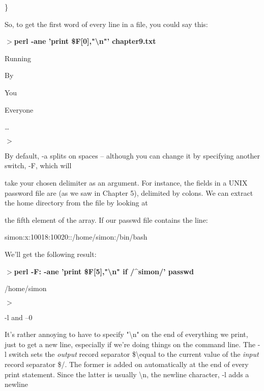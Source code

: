 \documentclass[a4paper,11pt]{book}
\begin{document}
\noindent \}

\noindent 

\noindent So, to get the first word of every line in a file, you could say this:

\noindent 

\noindent $>$\textbf{perl -ane 'print \$F[0],"\textbackslash n"' chapter9.txt}

\noindent Running

\noindent 

\noindent By

\noindent 

\noindent You

\noindent 

\noindent Everyone

\noindent \dots 

\noindent $>$

\noindent 

\noindent 

\noindent By default, -a splits on spaces -- although you can change it by specifying another switch, -F, which will

\noindent take your chosen delimiter as an argument. For instance, the fields in a UNIX password file are (as we saw in Chapter 5), delimited by colons. We can extract the home directory from the file by looking at

\noindent the fifth element of the array. If our passwd file contains the line:

\noindent 

\noindent 

\noindent simon:x:10018:10020::/home/simon:/bin/bash

\noindent 

\noindent We'll get the following result:

\noindent 

\noindent $>$\textbf{perl -F: -ane 'print \$F[5],"\textbackslash n" if /\^{}simon/' passwd}

\noindent /home/simon

\noindent $>$

\noindent 

\noindent -l and --0

\noindent 

\noindent It's rather annoying to have to specify "\textbackslash n" on the end of everything we print, just to get a new line, especially if we're doing things on the command line. The -l switch sets the \textit{output }record separator \$\textbackslash  equal to the current value of the \textit{input }record separator \$/. The former   is added on automatically at the end of every print statement. Since the latter is usually \textbackslash n, the newline character, -l adds a newline
\end{document}
